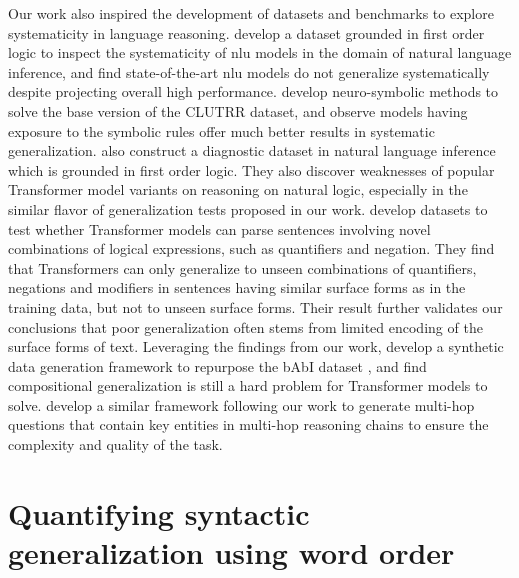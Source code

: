 \documentclass[letterpaper, 12pt]{report}
\begin{document}
Our work also inspired the development of datasets and benchmarks to explore systematicity in language reasoning.
\cite{goodwin-etal-2020-probing} develop a dataset grounded in first order logic to inspect the systematicity of \acrshort{nlu} models in the domain of natural language inference, and find state-of-the-art \acrshort{nlu} models do not generalize systematically despite projecting overall high performance.
\cite{minervini2020learning} develop neuro-symbolic methods to solve the base version of the CLUTRR dataset, and observe models having exposure to the symbolic rules offer much better results in systematic generalization.
\cite{tian-etal-2021-diagnosing} also construct a diagnostic dataset in natural language inference which is grounded in first order logic. They also discover weaknesses of popular Transformer model variants on reasoning on natural logic, especially in the similar flavor of generalization tests proposed in our work.
\cite{yanaka-etal-2021-sygns} develop datasets to test whether Transformer models can parse sentences involving novel combinations of logical expressions, such as quantifiers and negation. They find that Transformers can only generalize to unseen combinations of quantifiers, negations and modifiers in sentences having similar surface forms as in the training data, but not to unseen surface forms. Their result further validates our conclusions that poor generalization often stems from limited encoding of the surface forms of text.
Leveraging the findings from our work, \cite{tamari-etal-2022-dyna} develop a synthetic data generation framework to repurpose the bAbI dataset \citep{Weston2015-is}, and find compositional generalization is still a hard problem for Transformer models to solve.
\cite{fei-etal-2022-cqg} develop a similar framework following our work to generate multi-hop questions that contain key entities in multi-hop reasoning chains to ensure the complexity and quality of the task.


\clearpage
\chapter{Quantifying syntactic generalization using word order}
\label{sec:unli}
\end{document}
